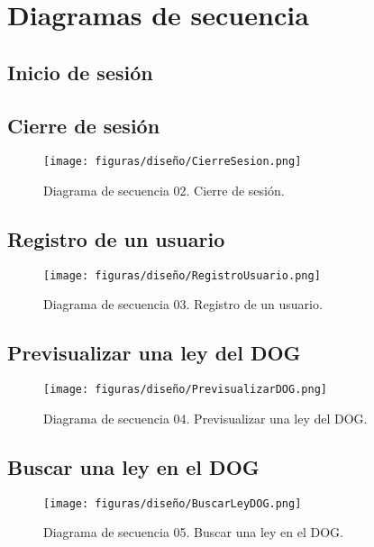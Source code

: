 \chapter{Diagramas de secuencia}
\label{enlaceDiagramasSecuencia}

\section{Inicio de sesión}


\section{Cierre de sesión}

\begin{figure}[H]
\centerline{\texttt{[image: figuras/diseño/CierreSesion.png]}}
\caption{Diagrama de secuencia 02. Cierre de sesión.}
\label{enlaceDCierreSesion}
\end{figure}


\section{Registro de un usuario}

\begin{figure}[H]
\centerline{\texttt{[image: figuras/diseño/RegistroUsuario.png]}}
\caption{Diagrama de secuencia 03. Registro de un usuario.}
\label{enlaceDRegistro}
\end{figure}


\section{Previsualizar una ley del DOG}

\begin{figure}[H]
\centerline{\texttt{[image: figuras/diseño/PrevisualizarDOG.png]}}
\caption{Diagrama de secuencia 04. Previsualizar una ley del DOG.}
\label{enlaceDPrevisualizarDOG}
\end{figure}


\section{Buscar una ley en el DOG}

\begin{figure}[H]
\centerline{\texttt{[image: figuras/diseño/BuscarLeyDOG.png]}}
\caption{Diagrama de secuencia 05. Buscar una ley en el DOG.}
\label{enlaceDBuscarDOG}
\end{figure}



